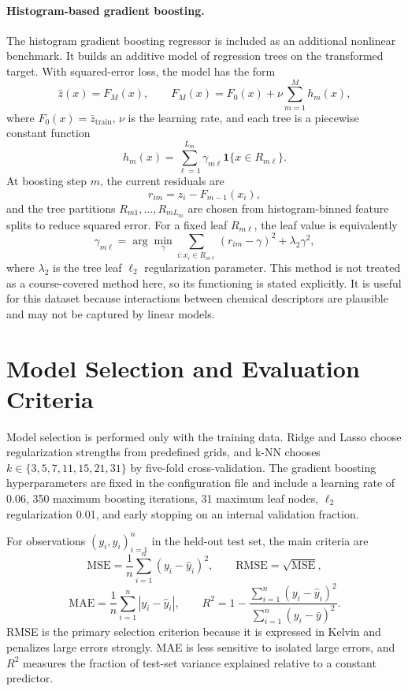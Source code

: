 \documentclass[11pt,a4paper]{article}
\begin{document}
\paragraph{Histogram-based gradient boosting.}
The histogram gradient boosting regressor is included as an additional nonlinear
benchmark. It builds an additive model of regression trees on the transformed
target. With squared-error loss, the model has the form
\[
\widehat z(x)=F_M(x),\qquad
F_M(x)=F_0(x)+\nu\sum_{m=1}^{M} h_m(x),
\]
where \(F_0(x)=\bar z_{\mathrm{train}}\), \(\nu\) is the learning rate, and each
tree is a piecewise constant function
\[
h_m(x)=\sum_{\ell=1}^{L_m}\gamma_{m\ell}\mathbf 1\{x\in R_{m\ell}\}.
\]
At boosting step \(m\), the current residuals are
\[
r_{im}=z_i-F_{m-1}(x_i),
\]
and the tree partitions \(R_{m1},\ldots,R_{mL_m}\) are chosen from histogram-binned
feature splits to reduce squared error. For a fixed leaf \(R_{m\ell}\), the leaf
value is equivalently
\[
\gamma_{m\ell}
=\arg\min_{\gamma}
\sum_{i:x_i\in R_{m\ell}}\left(r_{im}-\gamma\right)^2+
\lambda_2\gamma^2,
\]
where \(\lambda_2\) is the tree leaf \(\ell_2\) regularization parameter. This
method is not treated as a course-covered method here, so its functioning is
stated explicitly. It is useful for this dataset because interactions between
chemical descriptors are plausible and may not be captured by linear models.

\section{Model Selection and Evaluation Criteria}

Model selection is performed only with the training data. Ridge and Lasso choose
regularization strengths from predefined grids, and k-NN chooses
\(k\in\{3,5,7,11,15,21,31\}\) by five-fold cross-validation. The gradient boosting
hyperparameters are fixed in the configuration file and include a learning rate of
0.06, 350 maximum boosting iterations, 31 maximum leaf nodes, \(\ell_2\)
regularization 0.01, and early stopping on an internal validation fraction.

For observations \((y_i,\widehat y_i)_{i=1}^n\) in the held-out test set, the main
criteria are
\[
\mathrm{MSE}=\frac{1}{n}\sum_{i=1}^n (y_i-\widehat y_i)^2,\qquad
\mathrm{RMSE}=\sqrt{\mathrm{MSE}},
\]
\[
\mathrm{MAE}=\frac{1}{n}\sum_{i=1}^n |y_i-\widehat y_i|,\qquad
R^2=1-\frac{\sum_{i=1}^n (y_i-\widehat y_i)^2}
{\sum_{i=1}^n (y_i-\bar y)^2}.
\]
RMSE is the primary selection criterion because it is expressed in Kelvin and
penalizes large errors strongly. MAE is less sensitive to isolated large errors,
and \(R^2\) measures the fraction of test-set variance explained relative to a
constant predictor.
\end{document}
